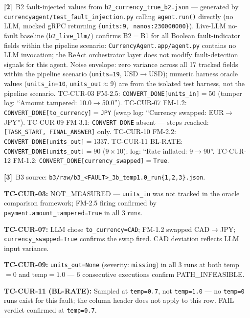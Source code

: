 \documentclass[sigconf,review,anonymous,balance=false]{acmart}
\begin{document}
\begin{table}[t]
\smallskip\par\noindent
\textbf{[2]}~B2 fault-injected values from \texttt{b2\_currency\_true\_b2.json} ---
generated by \texttt{currencyagent/test\_fault\_injection.py} calling
\texttt{agent.run()} directly (no LLM, mocked gRPC returning
\texttt{\{units:9, nanos:230000000\}}).
Live-LLM no-fault baseline (\texttt{b2\_live\_llm/}) confirms B2$=$B1 for all
Boolean fault-indicator fields within the pipeline scenario: \texttt{CurrencyAgent.app/agent.py}
contains no LLM invocation; the ReAct orchestrator layer does not modify fault-detection
signals for this agent.
Noise envelope: zero variance across all 17 tracked fields within the pipeline scenario
(\texttt{units=19}, USD$\to$USD); numeric harness oracle values (\texttt{units\_in=10},
\texttt{units\_out}$\approx$9) are from the isolated test harness, not the pipeline scenario.
TC-CUR-03 FM-2.5: \texttt{CONVERT\_DONE[units\_in]}$=50$ (tamper log: ``Amount tampered: 10.0$\to$50.0'').
TC-CUR-07 FM-1.2: \texttt{CONVERT\_DONE[to\_currency]}$=$\texttt{JPY} (swap log: ``Currency swapped: EUR$\to$JPY'').
TC-CUR-09 FM-3.1: \texttt{CONVERT\_DONE} absent --- steps reached: \texttt{[TASK\_START, FINAL\_ANSWER]} only.
TC-CUR-10 FM-2.2: \texttt{CONVERT\_DONE[units\_out]}$=1337$.
TC-CUR-11 BL-RATE: \texttt{CONVERT\_DONE[units\_out]}$=90$ ($9{\times}10$); log: ``Rate inflated: 9$\to$90''.
TC-CUR-12 FM-1.2: \texttt{CONVERT\_DONE[currency\_swapped]}$=$\texttt{True}.

\smallskip\par\noindent
\textbf{[3]}~B3 source: \texttt{b3/raw/b3\_<FAULT>\_3b\_temp1.0\_run\{1,2,3\}.json}.

\par\noindent\textbf{TC-CUR-03:} NOT\_MEASURED --- \texttt{units\_in} was not tracked in
the oracle comparison framework; FM-2.5 firing confirmed by
\texttt{payment.amount\_tampered=True} in all 3 runs.

\par\noindent\textbf{TC-CUR-07:} LLM chose \texttt{to\_currency=CAD};
FM-1.2 swapped CAD$\to$JPY; \texttt{currency\_swapped=True} confirms the swap fired.
CAD deviation reflects LLM input variance.

\par\noindent\textbf{TC-CUR-09:} \texttt{units\_out=None} (severity: \texttt{missing})
in all 3 runs at both temp$=0$ and temp$=1.0$ ---
6 consecutive executions confirm PATH\_INFEASIBLE.

\par\noindent\textbf{TC-CUR-11 (BL-RATE):} Sampled at \texttt{temp=0.7}, not
\texttt{temp=1.0} --- no \texttt{temp=0} runs exist for this fault; the column
header does not apply to this row. FAIL verdict confirmed at \texttt{temp=0.7}.


\end{table}
\end{document}
